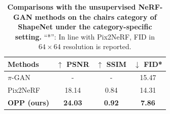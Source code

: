 \begin{table}[t]
    \setlength{\abovecaptionskip}{0cm}
    \footnotesize
     \caption{\textbf{Comparisons with the unsupervised NeRF-GAN methods on the chairs category of ShapeNet under the category-specific setting.} ``*'': In line with Pix2NeRF, FID in $64\times64$ resolution is reported. }
     \label{tab:unsupervised_nerf_gan}
\setlength\tabcolsep{15.5pt}
    \begin{tabular}{l|ccc}
        \rowcolor[gray]{.9}
        \hline
        Methods           & $\uparrow$ PSNR   & $\uparrow$ SSIM                               & $\downarrow$ FID*   \\ \hline \hline
        
        $\pi$-GAN~\cite{PiGAN_chan2021pi}     & - & -                                           &  15.47   \\                                
        Pix2NeRF~\cite{Pix2NeRF_cai2022pix2nerf}  & {18.14}  & 0.84                                                 &  14.31   \\
        \textbf{OPP (ours)} & \textbf{24.03}  & \textbf{0.92}      & \textbf{7.86} \\ 
        \hline
        \end{tabular}
\end{table}

